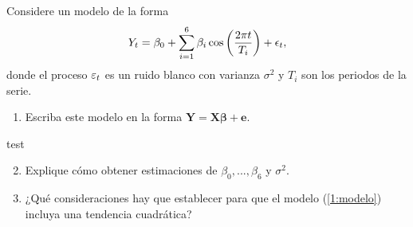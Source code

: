 \documentclass[../main.tex]{subfiles}
\begin{document}
    \begin{enunciado}
        Considere un modelo de la forma
            \begin{align}
            	\label{1:modelo}
            	Y_t = \beta_0 + \sum_{i = 1}^{6} \beta_i \cos\left( \frac{2\pi t}{T_i} \right) + \epsilon_t,
            \end{align}
        donde el proceso $\varepsilon_t$ es un ruido blanco con varianza $\sigma^2$ y $T_i$ son los periodos de la serie.
            \begin{enumerate}
            	\item Escriba este modelo en la forma $\boldsymbol{Y} = \boldsymbol{X} \boldsymbol{\beta} + \boldsymbol{e}$.
            \end{enumerate}
    \end{enunciado}
    
    \begin{demostracion}
        test
    \end{demostracion}
    \vspace{1em}
    \begin{enunciado}
    	\begin{enumerate}
            \setcounter{enumi}{1}
    		\item Explique cómo obtener estimaciones de $\beta_0, ..., \beta_6$ y $\sigma^2$.
    	\end{enumerate}

    \end{enunciado}
    
    \begin{demostracion}
    	
    \end{demostracion}
    \vspace{1em}
    
    \begin{enunciado}
    	\begin{enumerate}
            \setcounter{enumi}{2}
    		\item ¿Qué consideraciones hay que establecer para que el modelo (\ref{1:modelo}) incluya una tendencia cuadrática?
    	\end{enumerate}

    \end{enunciado}
    
    \begin{demostracion}
    	
    \end{demostracion}
    \vspace{1em}
\end{document}
